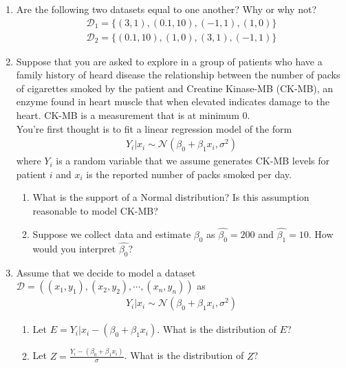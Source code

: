 \begin{enumerate}
    \item Are the following two datasets equal to one another? Why or why not? 
    \begin{align}
        \mathcal{D}_{1} = \{ (3,1),(0.1,10),(-1,1),(1,0) \}\\
        \mathcal{D}_{2} = \{(0.1,10), (1,0),(3,1),(-1,1) \}
    \end{align}
    
    \item  Suppose that you are asked to explore in a group of patients who have a family history of heard disease the relationship between the number of packs of cigarettes smoked by the patient and Creatine Kinase-MB (CK-MB), an enzyme found in heart muscle that when elevated indicates damage to the heart.
    CK-MB is a measurement that is at minimum 0.\\
    
    You're first thought is to fit a linear regression model of the form
    \begin{align}
        Y_{i}| x_{i} \sim \mathcal{N}\left( \beta_{0} + \beta_{1} x_{i}, \sigma^{2} \right)
    \end{align}
    where $Y_{i}$ is a random variable that we assume generates CK-MB levels for patient $i$ and $x_{i}$ is the reported number of packs smoked per day. 
    
    \begin{enumerate}
        \item What is the support of a Normal distribution? Is this assumption reasonable to model CK-MB? 
        \item Suppose we collect data and estimate $\beta_{0}$ as $\hat{\beta_{0}} = 200$ and $\hat{\beta_{1}} = 10$. 
        How would you interpret $\hat{\beta_{0}}$?
    \end{enumerate}

    \item Assume that we decide to model a dataset $\mathcal{D} = ( (x_{1},y_{1}),(x_{2},y_{2}),\cdots,(x_{n},y_{n})  )$ as 
    \begin{align}
        Y_{i} | x_{i} \sim \mathcal{N}\left( \beta_{0} + \beta_{1} x_{i}, \sigma^{2} \right)
    \end{align}
    
    \begin{enumerate}
        \item Let $E = Y_{i} | x_{i} - (\beta_{0} + \beta_{1} x_{i})$. 
        What is the distribution of $E$? 
        \item Let $Z = \frac{Y_{i} - (\beta_{0} + \beta_{1} x_{i})}{\sigma}$. What is the distribution of $Z$?
    \end{enumerate}
    

\end{enumerate}
